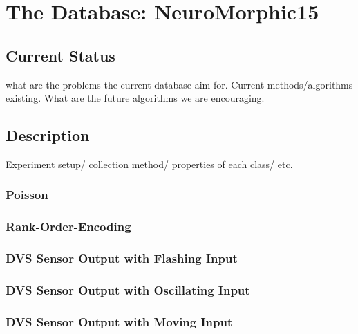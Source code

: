 \section{The Database: NeuroMorphic15}
\label{sec:data}
\subsection{Current Status}
what are the problems the current database aim for.
Current methods/algorithms existing.
What are the future algorithms we are encouraging.
\subsection{Description}
	Experiment setup/ collection method/ properties of each class/ etc.
	\subsubsection{Poisson}
	\subsubsection{Rank-Order-Encoding}
  
	\subsubsection{DVS Sensor Output with Flashing Input}
	\subsubsection{DVS Sensor Output with Oscillating Input}
	\subsubsection{DVS Sensor Output with Moving Input}
	
